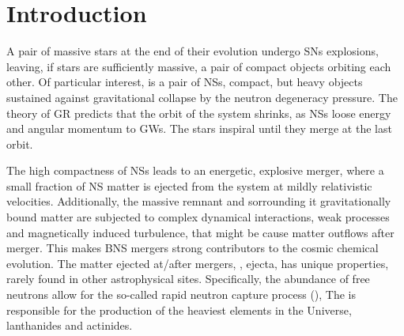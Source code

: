 \chapter{Introduction} \label{ch:intro}


A pair of massive stars at the end of their evolution undergo \acp{SN} explosions,
leaving, if stars are sufficiently massive, a pair of compact objects orbiting each other. 
Of particular interest, is a pair of \acp{NS}, compact, but heavy objects sustained 
against gravitational collapse by the neutron degeneracy pressure. 
The theory of \ac{GR} predicts that the orbit of the system shrinks, as \acp{NS} loose energy 
and angular momentum to \acp{GW}. The stars inspiral until they merge at the last orbit. 


The high compactness of \acp{NS} leads to an energetic, explosive merger, where a small 
fraction of \ac{NS} matter is ejected from the system at mildly relativistic 
velocities. 
Additionally, the massive \pmerg{} remnant and sorrounding it gravitationally bound 
matter are subjected to complex dynamical interactions, weak processes and magnetically induced 
turbulence, that might be cause matter outflows after merger. This makes \ac{BNS} mergers 
strong contributors to the cosmic chemical evolution. 
The matter ejected at/after mergers, \ie, ejecta, has unique properties, rarely found in other 
astrophysical sites. Specifically, the abundance of free neutrons allow for the so-called 
rapid neutron capture process (\rproc{}), 
The \rproc{} is responsible for the production of the heaviest elements in the 
Universe, lanthanides and actinides. 

